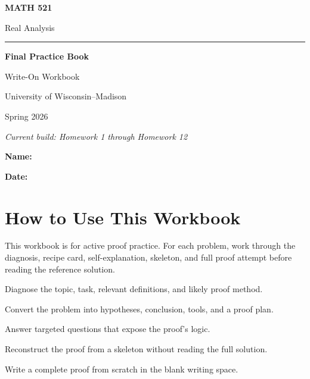 \documentclass[12pt]{article}
\begin{document}
\hypersetup{pageanchor=false}
\begin{titlepage}
\centering
\vspace*{2.35cm}
{\Huge\bfseries MATH 521\par}
\vspace{0.35cm}
{\Large Real Analysis\par}
\vspace{1.1cm}
\rule{0.55\linewidth}{1pt}
\vspace{1.1cm}

{\huge\bfseries Final Practice Book\par}
\vspace{0.7cm}
{\Large Write-On Workbook\par}
\vspace{1.5cm}

{\large University of Wisconsin--Madison\par}
{\large Spring 2026\par}
\vspace{1.7cm}

{\normalsize\itshape Current build: Homework 1 through Homework 12\par}
\vspace{2.8cm}

{\large\bfseries Name:\enspace\hrulefill\par}
\vspace{0.9cm}
{\large\bfseries Date:\enspace\hrulefill\par}
\end{titlepage}
\hypersetup{pageanchor=true}

\tableofcontents
\newpage

\section*{How to Use This Workbook}

This workbook is for active proof practice. For each problem, work through the diagnosis,
recipe card, self-explanation, skeleton, and full proof attempt before reading the reference
solution.

\begin{description}[leftmargin=2.2cm, labelwidth=2.0cm, labelsep=0.2cm, itemsep=4pt]
  \item[Pass 1] Diagnose the topic, task, relevant definitions, and likely proof method.
  \item[Pass 2] Convert the problem into hypotheses, conclusion, tools, and a proof plan.
  \item[Pass 3] Answer targeted questions that expose the proof's logic.
  \item[Pass 4] Reconstruct the proof from a skeleton without reading the full solution.
  \item[Pass 5] Write a complete proof from scratch in the blank writing space.
\end{description}
\end{document}
